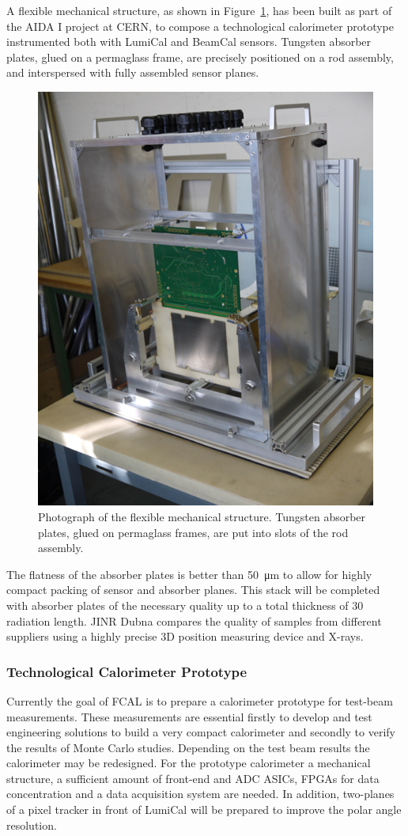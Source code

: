 A flexible mechanical structure, as shown in  Figure~\ref{fig:mechanical_structure}, has been built as part of the AIDA I project at CERN,
to compose a technological
calorimeter prototype instrumented both with LumiCal and BeamCal sensors.
Tungsten absorber plates, glued on a permaglass
frame, are precisely
positioned on a rod assembly, and interspersed with fully assembled sensor planes.
\begin{figure}[hbp]
\centering
\includegraphics[width=0.6\columnwidth,]{Calorimeter/FCAL/figs/mechanical_structure_2}
\caption{Photograph of the flexible mechanical structure. Tungsten absorber plates, glued on permaglass frames, are put into slots of the
rod assembly.}
\label{fig:mechanical_structure}
\end{figure}
The flatness of the absorber plates is better than \SI{50}{\micro\meter} to allow for highly compact packing of sensor and absorber planes. This stack will be completed
with absorber plates of the necessary quality up to a total thickness of 30 radiation length. JINR Dubna compares the quality
of samples from
different suppliers using a highly precise 3D position measuring device and X-rays.

\subsubsection{Technological Calorimeter Prototype}

Currently the goal of FCAL is to prepare a calorimeter prototype for test-beam measurements. These measurements
are essential firstly to develop and test engineering solutions to build a very compact calorimeter and
secondly to verify the results of Monte Carlo studies. Depending on the test beam
results the calorimeter may be redesigned.
For the prototype calorimeter
a mechanical structure, a sufficient amount of front-end and ADC ASICs, FPGAs for
data concentration and
a data acquisition system are needed. In addition,
two-planes of a pixel tracker in front of LumiCal will be prepared to improve the polar angle resolution.



